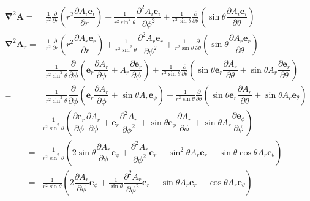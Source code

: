 \begin{align}
\boldsymbol{\nabla}^2\boldsymbol{A}=&\frac{1}{r^2}\frac{\partial}{\partial r}\left(r^2\dfrac{{\partial A_i\boldsymbol{e}_i}}{\partial r}\right)
+\frac{1}{r^2\sin^2\theta}\dfrac{{\partial^2 A_i\boldsymbol{e}_i}}{\partial \phi^2}
+\frac{1}{r^2\sin\theta}\frac{\partial}{\partial \theta}\left(\sin\theta\dfrac{{\partial A_i\boldsymbol{e}_i}}{\partial \theta}\right)\nonumber\\
\boldsymbol{\nabla}^2\boldsymbol{A}_r=&\frac{1}{r^2}\frac{\partial}{\partial r}\left(r^2\dfrac{{\partial A_r\boldsymbol{e}_r}}{\partial r}\right)
+\frac{1}{r^2\sin^2\theta}\dfrac{{\partial^2 A_r\boldsymbol{e}_r}}{\partial \phi^2}
+\frac{1}{r^2\sin\theta}\frac{\partial}{\partial \theta}\left(\sin\theta\dfrac{{\partial A_r\boldsymbol{e}_r}}{\partial \theta}\right)\nonumber\\
&\frac{1}{r^2\sin^2\theta}\dfrac{{\partial}}{\partial \phi}\left(\boldsymbol{e}_r\dfrac{{\partial A_r}}{\partial \phi}
+A_r\dfrac{{\partial \boldsymbol{e}_r}}{\partial \phi}\right)
+\frac{1}{r^2\sin\theta}\frac{\partial}{\partial \theta}\left(\sin\theta\boldsymbol{e}_r\dfrac{{\partial A_r}}{\partial \theta}
+\sin\theta A_r\dfrac{{\partial \boldsymbol{e}_r}}{\partial \theta}\right)\nonumber\\
=&\frac{1}{r^2\sin^2\theta}\dfrac{{\partial}}{\partial \phi}\left(\boldsymbol{e}_r\dfrac{{\partial A_r}}{\partial \phi}
+\sin\theta A_r\boldsymbol{e}_\phi\right)
+\frac{1}{r^2\sin\theta}\frac{\partial}{\partial \theta}\left(\sin\theta\boldsymbol{e}_r\dfrac{{\partial A_r}}{\partial \theta}
+\sin\theta A_r\boldsymbol{e}_\theta\right)\nonumber
\end{align}
\begin{align}
&\frac{1}{r^2\sin^2\theta}\left(\dfrac{{\partial\boldsymbol{e}_r}}{\partial \phi}\dfrac{{\partial A_r}}{\partial \phi}
+\boldsymbol{e}_r\dfrac{{\partial^2 A_r}}{\partial \phi^2}
+\sin\theta\boldsymbol{e}_\phi\dfrac{{\partial A_r}}{\partial \phi} 
+\sin\theta A_r\dfrac{{\partial\boldsymbol{e}_\phi}}{\partial \phi}\right)\nonumber\\
=&\frac{1}{r^2\sin^2\theta}\left(2\sin\theta\dfrac{{\partial A_r}}{\partial \phi}\boldsymbol{e}_\phi
+\dfrac{{\partial^2 A_r}}{\partial \phi^2}\boldsymbol{e}_r
-\sin^2\theta A_r\boldsymbol{e}_r
-\sin\theta\cos\theta A_r\boldsymbol{e}_\theta\right)\nonumber\\
=&\frac{1}{r^2\sin\theta}\left(2\dfrac{{\partial A_r}}{\partial \phi}\boldsymbol{e}_\phi
+\frac{1}{\sin\theta}\dfrac{{\partial^2 A_r}}{\partial \phi^2}\boldsymbol{e}_r
-\sin\theta A_r\boldsymbol{e}_r
-\cos\theta A_r\boldsymbol{e}_\theta\right)\nonumber
\end{align}
